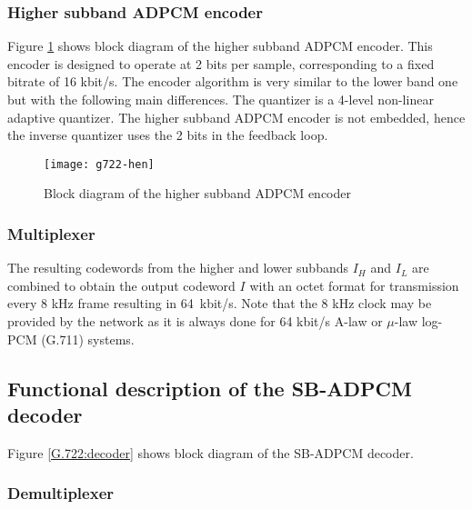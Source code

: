 \subsubsection{Higher subband ADPCM encoder}

Figure \ref{G722:high-encoder} shows block diagram of the higher
subband ADPCM encoder. This encoder is designed to operate at 2 bits
per sample, corresponding to a fixed bitrate of 16 kbit/s. The
encoder algorithm is very similar to the lower band one but with the
following main differences. The quantizer is a 4-level non-linear
adaptive quantizer. The higher subband ADPCM encoder is not embedded,
hence the inverse quantizer uses the 2 bits in the feedback loop.

\begin{figure}
    \begin{center}
    \texttt{[image: g722-hen]}
  \end{center}
  \caption{Block diagram of the higher subband ADPCM encoder
           \label{G722:high-encoder}}
\end{figure}

\subsubsection{Multiplexer}

The resulting codewords from the higher and lower subbands $I_H$ and
$I_L$ are combined to obtain the output codeword $I$ with an octet
format for transmission every 8 kHz frame resulting in 64~kbit/s. Note
that the 8 kHz clock may be provided by the network as it is always
done for 64 kbit/s A-law or $\mu$-law log-PCM (G.711) systems.


\subsection{Functional description of the SB-ADPCM decoder}
            \label{G722:descr-decoder}

Figure \ref{G.722:decoder} shows block diagram of the SB-ADPCM decoder.


\subsubsection{Demultiplexer}

